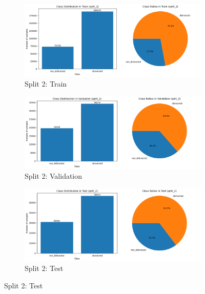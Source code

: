 \begin{figure}[htbp]
    \begin{subfigure}[b]{0.45\textwidth}
        \includegraphics[width=\textwidth]{Images_Thesis/class_distribution_Kinect_color/split_2_rgb_daa/class_dist_train_sp_2_rgb_daa.png}
        \caption{Split 2: Train}
        \label{fig:Class_dist_grid_image7}
    \end{subfigure}
    \hfill
    \begin{subfigure}[b]{0.45\textwidth}
        \includegraphics[width=\textwidth]{Images_Thesis/class_distribution_Kinect_color/split_2_rgb_daa/class_dist_val_sp_2_rgb_daa.png}
        \caption{Split 2: Validation}
        \label{fig:Class_dist_grid_image8}
    \end{subfigure}

    \begin{subfigure}[b]{0.45\textwidth}
        \includegraphics[width=\textwidth]{Images_Thesis/class_distribution_Kinect_color/split_2_rgb_daa/class_dist_test_sp_2_rgb_daa.png}
        \caption{Split 2: Test}
        \label{fig:Class_dist_grid_image9}
    \end{subfigure}


\end{figure}
